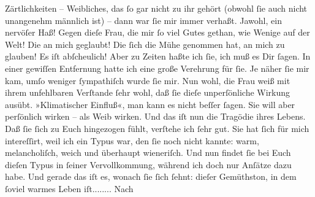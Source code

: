 \begin{ledgroupsized}[t]{13cm}
{{{                  Zärtlichkeiten}}}\label{K_L02735-7h} – Weibliches, das ſo gar nicht zu ihr gehört (obwohl ſie
               auch nicht unangenehm männlich ist) – dann war ſie 
               mir immer verhaßt. Jawohl, ein nervöſer Haß! Gegen dieſe Frau, die mir ſo viel Gutes gethan, wie
               Wenige auf  der Welt! Die an mich geglaubt! Die ſich
               die Mühe genommen hat, an {\pb}mich zu glauben! Es iſt
               abſcheulich! Aber zu Zeiten haßte ich ſie, ich muß es Dir ſagen. In einer gewiſſen
               Entfernung  hatte ich eine große Verehrung für
               ſie. Je näher ſie mir kam, umſo weniger ſympathiſch wurde ſie mir.\pend
           \pstart
           Nun wohl, die Frau weiß mit
               ihrem unfehlbaren Verſtande ſehr wohl, daß ſie dieſe unperſönliche Wirkung ausübt.
               »Klimatischer {\pb}Einfluß«, man kann es nicht beſſer
               ſagen. Sie will aber
               perſönlich wirken – als Weib wirken. Und das iſt nun die Tragödie ihres Lebens.\pend
           \pstart
           Daß ſie ſich zu Euch
               hingezogen fühlt, verſtehe ich ſehr gut. Sie hat ſich für mich intereſſirt, weil ich
               ein Typus war, den ſie noch nicht kannte: warm, melancholiſch, weich und  überhaupt wieneriſch. Und nun findet ſie
               bei Euch dieſen {\pb} Typus in ſeiner Vervollkommung, während ich doch
               nur Anſätze dazu habe. Und gerade das iſt es, wonach ſie ſich ſehnt: dieſer Gemüthston, in dem
               ſoviel warmes Leben iſt........\pend
           \pstart
           Nach \label{K_L02735-8v}
\end{ledgroupsized}
